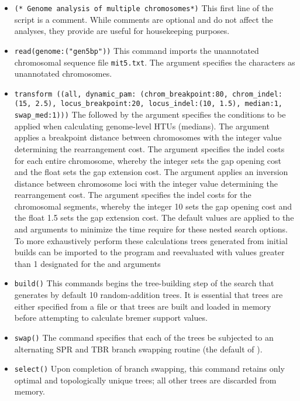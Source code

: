 \begin{itemize}
\item \texttt{(* Genome analysis of multiple chromosomes*)} This first line of the script is a comment. While comments are optional and do not affect the analyses, they provide are useful for housekeeping purposes.
\item \texttt{read(genome:("gen5bp"))} This command imports the unannotated chromosomal sequence file \texttt{mit5.txt}. The argument  specifies the characters as unannotated chromosomes.
\item \texttt{transform ((all, dynamic\_pam: (chrom\_breakpoint:80, chrom\_indel:(15, 2.5), locus\_breakpoint:20, locus\_indel:(10, 1.5), median:1, swap\_med:1)))}  The  followed by the argument  specifies the conditions to be applied when calculating genome-level HTUs (medians). The argument  applies a breakpoint distance between chromosomes with the integer value determining the rearrangement cost. The argument  specifies the indel costs for each entire chromosome, whereby the integer sets the gap opening cost and the float sets the gap extension cost.  The argument  applies an inversion distance between chromosome loci with the integer value determining the rearrangement cost. The argument  specifies the indel costs for the chromosomal segments, whereby the integer 10 sets the gap opening cost and the float 1.5 sets the gap extension cost.  The default values are applied to the  and  arguments to minimize the time require for these nested search options.   To more exhaustively perform these calculations trees generated from initial builds can be imported to the program and reevaluated with values greater than 1 designated for the  and  arguments
\item \texttt{build()} This commands begins the tree-building step of the search that generates by default 10 random-addition trees.  It is essential that trees are either specified from a file or that trees are built and loaded in memory before attempting to calculate bremer support values.
\item \texttt{swap()} The  command specifies that each of the trees be subjected to an alternating SPR and TBR branch swapping routine (the default of \poy).
\item \texttt{select()} Upon completion of branch swapping, this command retains only optimal and topologically unique trees; all other trees are discarded from memory. 

\end{itemize}
